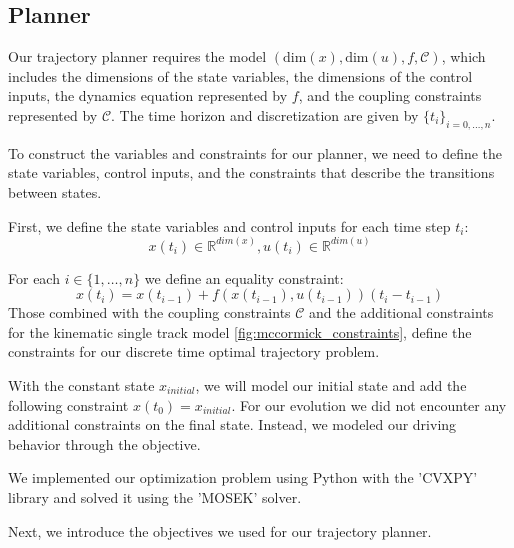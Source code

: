 \subsection{Planner}

Our trajectory planner requires the model $(\text{dim}(x), \text{dim}(u), f, \mathcal{C})$, which includes the dimensions of the state variables, the
dimensions of the control inputs, the dynamics equation represented by $f$, and the coupling constraints represented by $\mathcal{C}$.
The time horizon and discretization are given by $\{t_i\}_{i=0,\dots,n}$.

To construct the variables and constraints for our planner, we need to define the state variables, control inputs, and the constraints that describe
the transitions between states.

First, we define the state variables and control inputs for each time step $t_i$:
\begin{equation}
	x(t_i) \in \mathbb{R}^{dim(x)}, u(t_i) \in \mathbb{R}^{dim(u)}
\end{equation}

For each $i\in\{1,\dots,n\}$ we define an equality constraint:
\begin{equation}
	x(t_i) = x(t_{i-1}) + f(x(t_{i-1}), u(t_{i-1})) (t_i - t_{i-1})
\end{equation}
Those combined with the coupling constraints $\mathcal{C}$ and the additional constraints for the kinematic single track model
\ref{fig:mccormick_constraints}, define the constraints for our discrete time optimal trajectory problem.

With the constant state $x_{initial}$, we will model our initial state and add the following constraint $x(t_0) = x_{initial}$.
For our evolution we did not encounter any additional constraints on the final state.
Instead, we modeled our driving behavior through the objective.

We implemented our optimization problem using Python with the 'CVXPY' library and solved it using the 'MOSEK' solver.

Next, we introduce the objectives we used for our trajectory planner.

